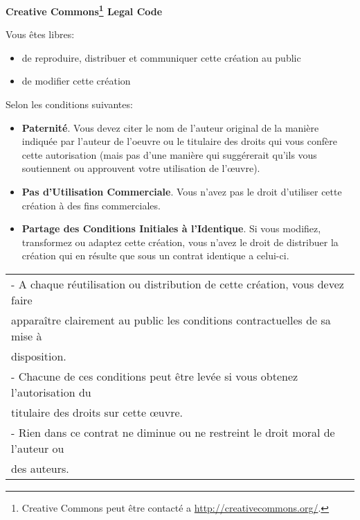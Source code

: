 \begin{center} \textbf{\LARGE{Creative Commons\footnote{Creative Commons peut être contacté a \url{http://creativecommons.org/}.} Legal Code}} \end{center}

\vspace{2cm}

Vous êtes libres:

\vspace{0.5cm}
\begin{itemize}
\item de reproduire, distribuer et communiquer cette création au public
\item de modifier cette création
\end{itemize}
\vspace{1cm}

Selon les conditions suivantes:

\vspace{0.5cm}
\begin{itemize}
\item \textbf{Paternité}. Vous devez citer le nom de l’auteur original
  de la manière indiquée par l’auteur de l’oeuvre ou le titulaire des
  droits qui vous confère cette autorisation (mais pas d’une manière
  qui suggérerait qu’ils vous soutiennent ou approuvent votre
  utilisation de l’\oe{}uvre).
\item \textbf{Pas d’Utilisation Commerciale}. Vous n’avez pas le droit
  d’utiliser cette création à des fins commerciales.
\item \textbf{Partage des Conditions Initiales à l’Identique}. Si vous
  modifiez, transformez ou adaptez cette création, vous n’avez le
  droit de distribuer la création qui en résulte que sous un contrat
  identique a celui-ci.
\end{itemize}

\vspace{1cm}
\begin{center}
  \begin{tabular}{|l|}
    \hline - A chaque réutilisation ou distribution de cette création,
    vous devez faire\\ apparaître clairement au public les conditions
    contractuelles de sa mise à\\ disposition.\\ - Chacune de ces
    conditions peut être levée si vous obtenez l’autorisation
    du\\ titulaire des droits sur cette \oe{}uvre.\\ - Rien dans ce
    contrat ne diminue ou ne restreint le droit moral de l’auteur
    ou\\ des auteurs.\\ \hline
  \end{tabular}
\end{center}

